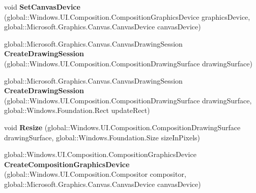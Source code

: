 \begin{DoxyCompactItemize}
void {\bfseries Set\+Canvas\+Device} (global\+::\+Windows.\+U\+I.\+Composition.\+Composition\+Graphics\+Device graphics\+Device, global\+::\+Microsoft.\+Graphics.\+Canvas.\+Canvas\+Device canvas\+Device)
\item 
\mbox{\label{interface_microsoft_1_1_graphics_1_1_canvas_1_1_u_i_1_1_composition_1_1_i_canvas_composition_statics_a742fc5f5398406c730e6f87b2755b86a}} 
global\+::\+Microsoft.\+Graphics.\+Canvas.\+Canvas\+Drawing\+Session {\bfseries Create\+Drawing\+Session} (global\+::\+Windows.\+U\+I.\+Composition.\+Composition\+Drawing\+Surface drawing\+Surface)
\item 
\mbox{\label{interface_microsoft_1_1_graphics_1_1_canvas_1_1_u_i_1_1_composition_1_1_i_canvas_composition_statics_a3be55117be22745ae6372f082447a79b}} 
global\+::\+Microsoft.\+Graphics.\+Canvas.\+Canvas\+Drawing\+Session {\bfseries Create\+Drawing\+Session} (global\+::\+Windows.\+U\+I.\+Composition.\+Composition\+Drawing\+Surface drawing\+Surface, global\+::\+Windows.\+Foundation.\+Rect update\+Rect)
\item 
\mbox{\label{interface_microsoft_1_1_graphics_1_1_canvas_1_1_u_i_1_1_composition_1_1_i_canvas_composition_statics_aa321ab037c7b505b333681f0b3bdc829}} 
void {\bfseries Resize} (global\+::\+Windows.\+U\+I.\+Composition.\+Composition\+Drawing\+Surface drawing\+Surface, global\+::\+Windows.\+Foundation.\+Size size\+In\+Pixels)
\item 
\mbox{\label{interface_microsoft_1_1_graphics_1_1_canvas_1_1_u_i_1_1_composition_1_1_i_canvas_composition_statics_abc5bb79cc44eecbedc66ea29c5052d3d}} 
global\+::\+Windows.\+U\+I.\+Composition.\+Composition\+Graphics\+Device {\bfseries Create\+Composition\+Graphics\+Device} (global\+::\+Windows.\+U\+I.\+Composition.\+Compositor compositor, global\+::\+Microsoft.\+Graphics.\+Canvas.\+Canvas\+Device canvas\+Device)
\item 
\mbox{\label{interface_microsoft_1_1_graphics_1_1_canvas_1_1_u_i_1_1_composition_1_1_i_canvas_composition_statics_a6803bff12a2a0f2d9c35cdac60868b7b}} 

\end{DoxyCompactItemize}
